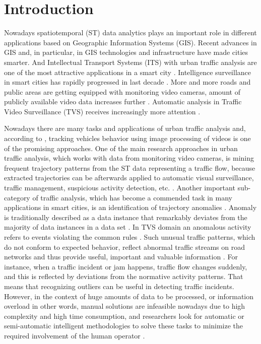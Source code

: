 \chapter{Introduction}
\label{ch:Introduction}

Nowadays spatiotemporal (ST) data analytics plays an important role in different applications based on Geographic Information Systems (GIS). Recent advances in GIS and, in particular, in GIS technologies and infrastructure have made cities smarter. And Intellectual Transport Systems (ITS) with urban traffic analysis are one of the most attractive applications in a smart city \cite{article:2_survey_urban}. Intelligence surveillance in smart cities has rapidly progressed in last decade \cite{article:9_trb_vc_aev_sc}. More and more roads and public areas are getting equipped with monitoring video cameras, amount of publicly available video data increases further \cite{article:4_detect_eatp}. Automatic analysis in Traffic Video Surveillance (TVS) receives increasingly more attention \cite{inproceedings:21_ad_dbscan_tvs}.

Nowadays there are many tasks and applications of urban traffic analysis and, according to \cite{article:9_trb_vc_aev_sc}, tracking vehicles behavior using image processing of videos is one of the promising approaches. One of the main research approaches in urban traffic analysis, which works with data from monitoring video cameras, is mining frequent trajectory patterns from the ST data representing a traffic flow, because extracted trajectories can be afterwards applied to automatic visual surveillance, traffic management, suspicious activity detection, etc. \cite{article:5_survey_tbsa}\cite{article:over_tod}. Another important sub-category of traffic analysis, which has become a commended task in many applications in smart cities, is an identification of trajectory anomalies \cite{article:9_trb_vc_aev_sc}. Anomaly is traditionally described as a data instance that remarkably deviates from the majority of data instances in a data set \cite{article:1_survey_stdm}. In TVS domain an anomalous activity refers to events violating the common rules \cite{inproceedings:21_ad_dbscan_tvs}. Such unusual traffic patterns, which do not conform to expected behavior, reflect abnormal traffic streams on road networks and thus provide useful, important and valuable information \cite{article:9_trb_vc_aev_sc}. For instance, when a traffic incident or jam happens, traffic flow changes suddenly, and this is reflected by deviations from the normative activity patterns. That means that recognizing outliers can be useful in detecting traffic incidents. However, in the context of huge amounts of data to be processed, or information overload in other words, manual solutions are infeasible nowadays due to high complexity and high time consumption, and researchers look for automatic or semi-automatic intelligent methodologies to solve these tasks to minimize the required involvement of the human operator \cite{article:19_gbta_ubd_is}.

